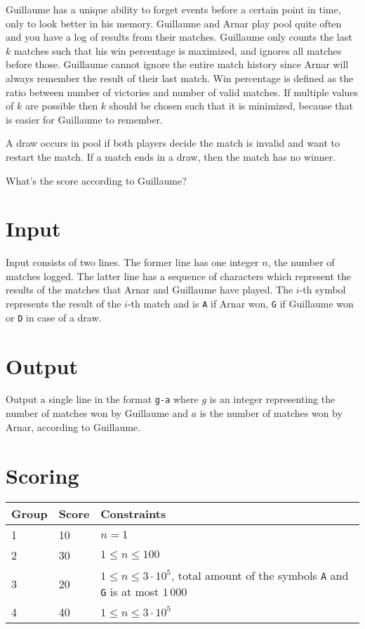 
Guillaume has a unique ability to forget events before a certain point in time, only to look better in his memory.
Guillaume and Arnar play pool quite often and you have a log of results from their matches.
Guillaume only counts the last $k$ matches such that his win percentage is maximized, and ignores all matches before those.
Guillaume cannot ignore the entire match history since Arnar will always remember the result of their last match.
Win percentage is defined as the ratio between number of victories and number of valid matches.
If multiple values of $k$ are possible then $k$ should be chosen such that it is minimized, because that is easier for Guillaume to remember.

A draw occurs in pool if both players decide the match is invalid and want to restart the match.
If a match ends in a draw, then the match has no winner.

What's the score according to Guillaume?

\section*{Input}
Input consists of two lines.
The former line has one integer $n$, the number of matches logged.
The latter line has a sequence of characters which represent the results of the matches that Arnar and Guillaume have played.
The $i$-th symbol represents the result of the $i$-th match and is \texttt{A} if Arnar won, \texttt{G} if Guillaume won or \texttt{D} in case of a draw.

\section*{Output}
Output a single line in the format \texttt{g-a} where $g$ is an integer representing the number of matches won by Guillaume and $a$ is the number of matches won by Arnar, according to Guillaume.

\section*{Scoring}
\begin{tabular}{|l|l|l|}
\hline
Group & Score & Constraints \\ \hline
1     & 10   & $n = 1$ \\ \hline
2     & 30   & $1 \leq n \leq 100$ \\ \hline
3     & 20   & $1 \leq n \leq 3 \cdot 10^5$, total amount of the symbols \texttt{A} and \texttt{G} is at most $1\,000$  \\ \hline
4     & 40   & $1 \leq n \leq 3 \cdot 10^5$ \\ \hline
\end{tabular}

